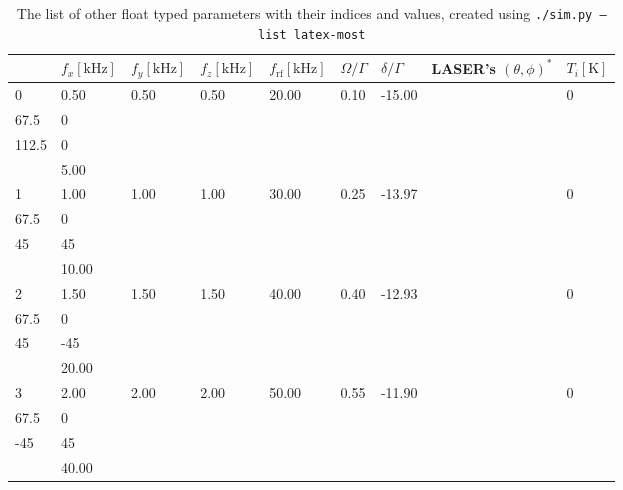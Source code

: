 \begin{longtable}{lllllllrl}
\caption{The list of other float typed parameters with their indices and values, created using \texttt{./sim.py --list latex-most}}\label{tbl:sim-list-most} \\
\hline
    & $f_x \mathrm{[kHz]}$   & $f_y \mathrm{[kHz]}$   & $f_z \mathrm{[kHz]}$   & $f_\mathrm{rf} \mathrm{[kHz]}$   & $\Omega/\Gamma$   & $\delta/\Gamma$   &                                                           LASER's $(\theta,\phi)^*$ & $T_i \mathrm{[K]}$   \\ \hline
\hline \hline\endhead
 0  & 0.50                   & 0.50                   & 0.50                   & 20.00                            & 0.10              & -15.00            &       \begin{tabular}{lr}   0     & 0 \\  67.5  & 0 \\  112.5 & 0 \\  \end{tabular} & 5.00                 \\ \hline
 1  & 1.00                   & 1.00                   & 1.00                   & 30.00                            & 0.25              & -13.97            &       \begin{tabular}{lr}   0    &  0 \\  67.5 &  0 \\  45   & 45 \\  \end{tabular} & 10.00                \\ \hline
 2  & 1.50                   & 1.50                   & 1.50                   & 40.00                            & 0.40              & -12.93            &    \begin{tabular}{lr}   0    &   0 \\  67.5 &   0 \\  45   & -45 \\  \end{tabular} & 20.00                \\ \hline
 3  & 2.00                   & 2.00                   & 2.00                   & 50.00                            & 0.55              & -11.90            &       \begin{tabular}{lr}   0    &  0 \\  67.5 &  0 \\  -45  & 45 \\  \end{tabular} & 40.00                \\ \hline

\end{longtable}
